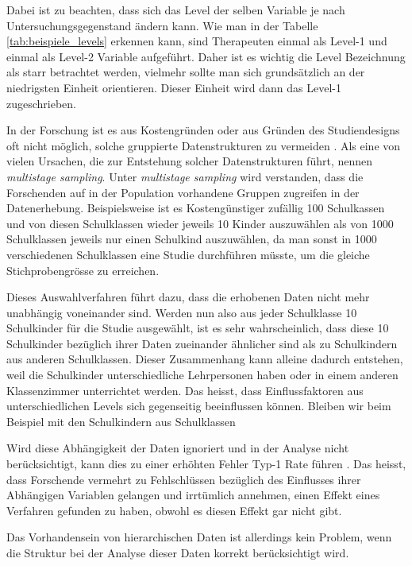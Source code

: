 \documentclass[12pt]{article}\usepackage[]{graphicx}\usepackage[]{color}
\begin{document}
Dabei ist zu beachten, dass sich das Level der selben Variable je nach Untersuchungsgegenstand ändern kann. Wie man in der Tabelle \ref{tab:beispiele_levels} erkennen kann, sind Therapeuten einmal als Level-1 und einmal als Level-2 Variable aufgeführt. Daher ist es wichtig die Level Bezeichnung als starr betrachtet werden, vielmehr sollte man sich grundsätzlich an der niedrigsten Einheit orientieren. Dieser Einheit wird dann das Level-1 zugeschrieben.

In der Forschung ist es aus Kostengründen oder aus Gründen des Studiendesigns oft nicht möglich, solche gruppierte Datenstrukturen zu vermeiden \citep{SnijdersTomA.B2012Ma:a, woltman2012introduction}. Als eine von vielen Ursachen, die zur Entstehung solcher Datenstrukturen führt, nennen \cite{SnijdersTomA.B2012Ma:a} \textit{multistage sampling}. Unter \textit{multistage sampling} wird verstanden, dass die Forschenden auf in der Population vorhandene Gruppen zugreifen in der Datenerhebung. Beispielsweise ist es Kostengünstiger zufällig 100 Schulkassen und von diesen Schulklassen wieder jeweils 10 Kinder auszuwählen als von 1000 Schulklassen jeweils nur einen Schulkind auszuwählen, da man sonst in 1000 verschiedenen Schulklassen eine Studie durchführen müsste, um die gleiche Stichprobengrösse zu erreichen. 

Dieses Auswahlverfahren führt dazu, dass die erhobenen Daten nicht mehr unabhängig voneinander sind. Werden nun also aus jeder Schulklasse 10 Schulkinder für die Studie ausgewählt, ist es sehr wahrscheinlich, dass diese 10 Schulkinder bezüglich ihrer Daten zueinander ähnlicher sind als zu Schulkindern aus anderen Schulklassen. Dieser Zusammenhang kann alleine dadurch entstehen, weil die Schulkinder unterschiedliche Lehrpersonen haben oder in einem anderen Klassenzimmer unterrichtet werden. Das heisst, dass Einflussfaktoren aus unterschiedlichen Levels sich gegenseitig beeinflussen können. Bleiben wir beim Beispiel mit den Schulkindern aus Schulklassen


Wird diese Abhängigkeit der Daten ignoriert und in der Analyse nicht berücksichtigt, kann dies zu einer erhöhten Fehler Typ-1 Rate führen \citep{dorman2008effect, mcneish2014analyzing}. Das heisst, dass Forschende vermehrt zu Fehlschlüssen bezüglich des Einflusses ihrer Abhängigen Variablen gelangen und irrtümlich annehmen, einen Effekt eines Verfahren gefunden zu haben, obwohl es diesen Effekt gar nicht gibt.



Das Vorhandensein von hierarchischen Daten ist allerdings kein Problem, wenn die Struktur bei der Analyse dieser Daten korrekt berücksichtigt wird. 
\end{document}

